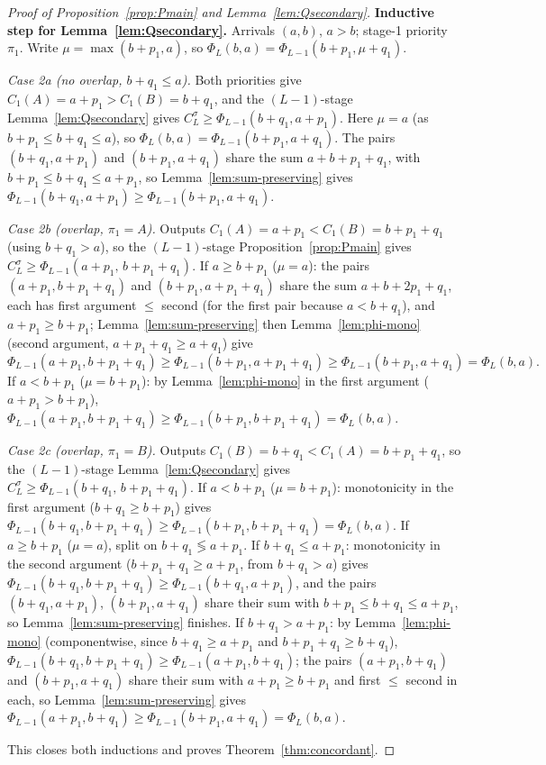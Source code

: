 \documentclass[sn-mathphys,NameDate]{sn-jnl}
\theoremstyle{thmstyleone}
\theoremstyle{thmstylethree}
\theoremstyle{thmstyletwo}
\begin{document}
\begin{proof}[Proof of Proposition~\ref{prop:Pmain} and
Lemma~\ref{lem:Qsecondary}]
\textbf{Inductive step for Lemma~\ref{lem:Qsecondary}.}
Arrivals $(a, b)$, $a > b$; stage-1 priority $\pi_1$. Write
$\mu = \max(b + p_1, a)$, so
$\Phi_L(b, a) = \Phi_{L-1}(b + p_1, \mu + q_1)$.

\emph{Case 2a (no overlap, $b + q_1 \leq a$).} Both
priorities give $C_1(A) = a + p_1 > C_1(B) = b + q_1$, and the
$(L{-}1)$-stage Lemma~\ref{lem:Qsecondary} gives
$C_L^\sigma \geq \Phi_{L-1}(b + q_1, a + p_1)$. Here
$\mu = a$ (as $b + p_1 \leq b + q_1 \leq a$), so
$\Phi_L(b,a) = \Phi_{L-1}(b + p_1, a + q_1)$. The pairs
$(b + q_1, a + p_1)$ and $(b + p_1, a + q_1)$ share the sum
$a + b + p_1 + q_1$, with
$b + p_1 \leq b + q_1 \leq a + p_1$, so
Lemma~\ref{lem:sum-preserving} gives
$\Phi_{L-1}(b + q_1, a + p_1) \geq
 \Phi_{L-1}(b + p_1, a + q_1)$.

\emph{Case 2b (overlap, $\pi_1 = A$).} Outputs
$C_1(A) = a + p_1 < C_1(B) = b + p_1 + q_1$ (using
$b + q_1 > a$), so the $(L{-}1)$-stage
Proposition~\ref{prop:Pmain} gives
$C_L^\sigma \geq \Phi_{L-1}(a + p_1,\, b + p_1 + q_1)$.
If $a \geq b + p_1$ ($\mu = a$): the pairs
$(a + p_1, b + p_1 + q_1)$ and $(b + p_1, a + p_1 + q_1)$
share the sum $a + b + 2p_1 + q_1$, each has first argument
$\leq$ second (for the first pair because $a < b + q_1$), and
$a + p_1 \geq b + p_1$; Lemma~\ref{lem:sum-preserving} then
Lemma~\ref{lem:phi-mono} (second argument,
$a + p_1 + q_1 \geq a + q_1$) give
\[
  \Phi_{L-1}(a {+} p_1, b {+} p_1 {+} q_1)
  \geq \Phi_{L-1}(b {+} p_1, a {+} p_1 {+} q_1)
  \geq \Phi_{L-1}(b {+} p_1, a {+} q_1) = \Phi_L(b, a).
\]
If $a < b + p_1$ ($\mu = b + p_1$): by
Lemma~\ref{lem:phi-mono} in the first argument
($a + p_1 > b + p_1$),
$\Phi_{L-1}(a + p_1, b + p_1 + q_1) \geq
 \Phi_{L-1}(b + p_1, b + p_1 + q_1) = \Phi_L(b, a)$.

\emph{Case 2c (overlap, $\pi_1 = B$).} Outputs
$C_1(B) = b + q_1 < C_1(A) = b + p_1 + q_1$, so the
$(L{-}1)$-stage Lemma~\ref{lem:Qsecondary} gives
$C_L^\sigma \geq \Phi_{L-1}(b + q_1,\, b + p_1 + q_1)$.
If $a < b + p_1$ ($\mu = b + p_1$): monotonicity in the first
argument ($b + q_1 \geq b + p_1$) gives
$\Phi_{L-1}(b + q_1, b + p_1 + q_1) \geq
 \Phi_{L-1}(b + p_1, b + p_1 + q_1) = \Phi_L(b, a)$.
If $a \geq b + p_1$ ($\mu = a$), split on
$b + q_1 \lessgtr a + p_1$. If $b + q_1 \leq a + p_1$:
monotonicity in the second argument
($b + p_1 + q_1 \geq a + p_1$, from $b + q_1 > a$) gives
$\Phi_{L-1}(b + q_1, b + p_1 + q_1) \geq
 \Phi_{L-1}(b + q_1, a + p_1)$, and the pairs
$(b + q_1, a + p_1)$, $(b + p_1, a + q_1)$ share their sum
with $b + p_1 \leq b + q_1 \leq a + p_1$, so
Lemma~\ref{lem:sum-preserving} finishes. If
$b + q_1 > a + p_1$: by Lemma~\ref{lem:phi-mono}
(componentwise, since $b + q_1 \geq a + p_1$ and
$b + p_1 + q_1 \geq b + q_1$),
$\Phi_{L-1}(b + q_1, b + p_1 + q_1) \geq
 \Phi_{L-1}(a + p_1, b + q_1)$; the pairs
$(a + p_1, b + q_1)$ and $(b + p_1, a + q_1)$ share their sum
with $a + p_1 \geq b + p_1$ and first $\leq$ second in each,
so Lemma~\ref{lem:sum-preserving} gives
$\Phi_{L-1}(a + p_1, b + q_1) \geq
 \Phi_{L-1}(b + p_1, a + q_1) = \Phi_L(b, a)$.

This closes both inductions and proves
Theorem~\ref{thm:concordant}.
\end{proof}
\end{document}
